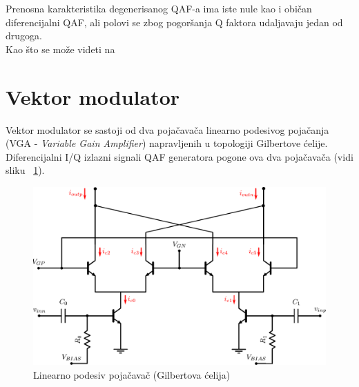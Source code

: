 \documentclass[journal,twocolumn,letterpaper]{IEEEJERM}
\begin{document}
Prenosna karakteristika degenerisanog QAF-a ima iste nule kao i običan diferencijalni QAF, ali polovi se zbog pogoršanja Q faktora udaljavaju jedan od drugoga. \\

Kao što se može videti na


\section{Vektor modulator}

Vektor modulator se sastoji od dva pojačavača linearno podesivog pojačanja (VGA - \textit{Variable Gain Amplifier}) napravljenih u topologiji Gilbertove ćelije. Diferencijalni I/Q izlazni signali QAF generatora pogone ova dva pojačavača (vidi sliku ~\ref{fig:vga_vmod}).

\begin{figure}[!htbp]
  \centering
  \includegraphics[width=\linewidth]{vga_vmod.pdf}
  \caption{Linearno podesiv pojačavač (Gilbertova ćelija)}
  \label{fig:vga_vmod}
\end{figure}
\end{document}
